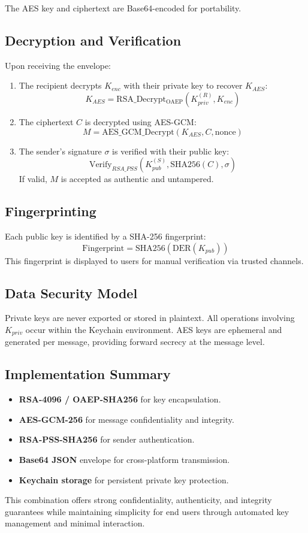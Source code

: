 The AES key and ciphertext are Base64-encoded for portability.

\subsection{Decryption and Verification}
Upon receiving the envelope:
\begin{enumerate}
  \item The recipient decrypts $K_{enc}$ with their private key to recover $K_{AES}$:
  \[
  K_{AES} = \mathrm{RSA\_Decrypt_{OAEP}}(K_{priv}^{(R)}, K_{enc})
  \]
  \item The ciphertext $C$ is decrypted using AES-GCM:
  \[
  M = \mathrm{AES\_GCM\_Decrypt}(K_{AES}, C, \text{nonce})
  \]
  \item The sender’s signature $\sigma$ is verified with their public key:
  \[
  \mathrm{Verify}_{RSA\_PSS}(K_{pub}^{(S)}, \mathrm{SHA256}(C), \sigma)
  \]
  If valid, $M$ is accepted as authentic and untampered.
\end{enumerate}

\subsection{Fingerprinting}
Each public key is identified by a SHA-256 fingerprint:
\[
\text{Fingerprint} = \mathrm{SHA256}(\text{DER}(K_{pub}))
\]
This fingerprint is displayed to users for manual verification via trusted channels.

\subsection{Data Security Model}
Private keys are never exported or stored in plaintext.  
All operations involving $K_{priv}$ occur within the Keychain environment.  
AES keys are ephemeral and generated per message, providing forward secrecy at the message level.  

\subsection{Implementation Summary}
\begin{itemize}
  \item \textbf{RSA-4096 / OAEP-SHA256} for key encapsulation.
  \item \textbf{AES-GCM-256} for message confidentiality and integrity.
  \item \textbf{RSA-PSS-SHA256} for sender authentication.
  \item \textbf{Base64 JSON} envelope for cross-platform transmission.
  \item \textbf{Keychain storage} for persistent private key protection.
\end{itemize}

This combination offers strong confidentiality, authenticity, and integrity guarantees while maintaining simplicity for end users through automated key management and minimal interaction.